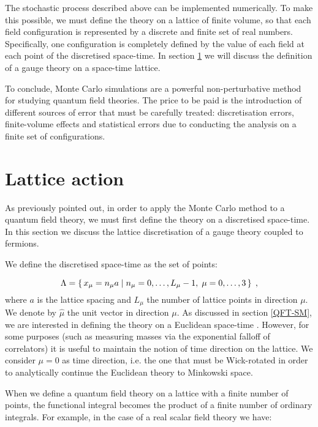 The stochastic process described above can be implemented numerically. To make this possible, we must define the theory on a lattice of finite volume, so that each field configuration is represented by a discrete and finite set of real numbers. Specifically, one configuration is completely defined by the value of each field at each point of the discretised space-time.  In section \ref{Lattice_action} we will discuss the definition of a gauge theory on a space-time lattice.

To conclude, Monte Carlo simulations are a powerful non-perturbative method for studying quantum field theories. The price to be paid is the introduction of different sources of error that must be carefully treated: discretisation errors, finite-volume effects and statistical errors due to conducting the analysis on a finite set of configurations. 





\section{Lattice action}
\label{Lattice_action}

As previously pointed out, in order to apply the Monte Carlo method to a quantum field theory, we must first define the theory on a discretised space-time. In this section we discuss the lattice discretisation of a gauge theory coupled to fermions.

We define the discretised space-time as the set of points:

\begin{equation}
\Lambda = \set{x_{\mu} = n_{\mu} a  \mid  n_{\mu} = 0, \dots, L_{\mu} -1, \; \mu = 0, \dots, 3 } \; ,
\end{equation}
%
where $a$ is the lattice spacing and $L_{ \mu}$ the number of lattice points in direction $\mu$. We denote by $\hat \mu$ the unit vector in direction $\mu$. As discussed in section \ref{QFT-SM}, we are interested in defining the theory on a Euclidean space-time . However, for some purposes (such as measuring masses via the exponential falloff of correlators) it is useful to maintain the notion of time direction on the lattice. We consider $\mu = 0$ as time direction, i.e. the one that must be Wick-rotated in order to analytically continue the Euclidean theory to Minkowski space.

When we define a quantum field theory on a lattice with a finite number of points, the functional integral becomes the product of a finite number of ordinary integrals. For example, in the case of a real scalar field theory we have:

